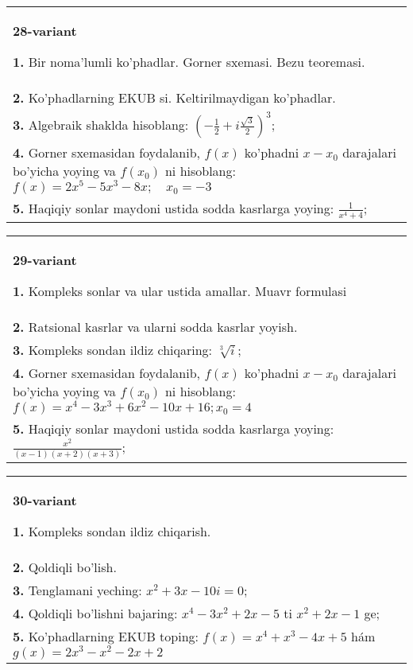 \documentclass{article}
\begin{document}
\begin{tabular}{m{17cm}}
\textbf{28-variant}
\newline

\textbf{1.} Bir noma’lumli ko’phadlar. Gorner sxemasi. Bezu teoremasi.  \\
\textbf{2.} Ko’phadlarning EKUB si. Keltirilmaydigan ko’phadlar. \\
\textbf{3.} Algebraik shaklda hisoblang:  $\left(-\frac{1}{2}+i \frac{\sqrt{3}}{2}\right)^3$; \\
\textbf{4.} Gorner sxemasidan foydalanib, $f(x)$ ko’phadni $x-x_0$ darajalari bo’yicha yoying va $f\left(x_0\right)$ ni hisoblang: $f(x)=2 x^5-5 x^3-8 x ; \quad x_0=-3$ \\
\textbf{5.} Haqiqiy sonlar maydoni ustida sodda kasrlarga yoying:  $\frac{1}{x^4+4}$; \\

\end{tabular}
\vspace{1cm}


\begin{tabular}{m{17cm}}
\textbf{29-variant}
\newline

\textbf{1.} Kompleks sonlar va ular ustida amallar. Muavr formulasi  \\
\textbf{2.} Ratsional kasrlar va ularni sodda kasrlar yoyish. \\
\textbf{3.} Kompleks sondan ildiz chiqaring:  $\sqrt[3]{i}$; \\
\textbf{4.} Gorner sxemasidan foydalanib, $f(x)$ ko’phadni $x-x_0$ darajalari bo’yicha yoying va $f\left(x_0\right)$ ni hisoblang: $f(x)=x^4-3 x^3+6 x^2-10 x+16 ; x_0=4$ \\
\textbf{5.} Haqiqiy sonlar maydoni ustida sodda kasrlarga yoying:  $\frac{x^2}{(x-1)(x+2)(x+3)}$; \\

\end{tabular}
\vspace{1cm}


\begin{tabular}{m{17cm}}
\textbf{30-variant}
\newline

\textbf{1.} Kompleks sondan ildiz chiqarish. \\
\textbf{2.} Qoldiqli bo’lish.  \\
\textbf{3.} Tenglamani yeching:  $x^2+3 x-10 i=0$; \\
\textbf{4.} Qoldiqli bo’lishni bajaring: $x^4-3 x^2+2 x-5$ ti $x^2+2 x-1$ ge; \\
\textbf{5.} Ko’phadlarning EKUB toping:  $f(x)=x^4+x^3-4 x+5$ hám $g(x)=2 x^3-x^2-2 x+2$ \\

\end{tabular}
\vspace{1cm}
\end{document}
